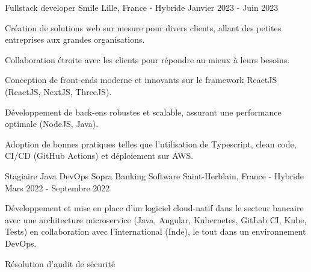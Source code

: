 \begin{cventries}
  \cventry
    {Fullstack developer} %
    {Smile} %
    {Lille, France - Hybride} %
    {Janvier 2023 - Juin 2023} %
    {
      \begin{cvitems} %
        \item {Création de solutions web sur mesure pour divers clients, allant des petites entreprises aux grandes organisations.}
        \item {Collaboration étroite avec les clients pour répondre au mieux à leurs besoins.}
        \item {Conception de front-ends moderne et innovants sur le framework ReactJS (ReactJS, NextJS, ThreeJS).}
        \item {Développement de back-ens robustes et scalable, assurant une performance optimale (NodeJS, Java).}
        \item {Adoption de bonnes pratiques telles que l'utilisation de Typescript, clean code, CI/CD (GitHub Actions) et déploiement sur AWS.}
      \end{cvitems}
    }


  \cventry
    {Stagiaire Java DevOps} %
    {Sopra Banking Software} %
    {Saint-Herblain, France - Hybride} %
    {Mars 2022 - Septembre 2022} %
    {
      \begin{cvitems} %
        \item {Développement et mise en place d'un logiciel cloud-natif dans le secteur bancaire avec une architecture microservice (Java, Angular, Kubernetes, GitLab CI, Kube, Tests) en collaboration avec l'international (Inde), le tout dans un environnement DevOps.}
        \item {Résolution d'audit de sécurité}
      \end{cvitems}
    }
    

\end{cventries}
